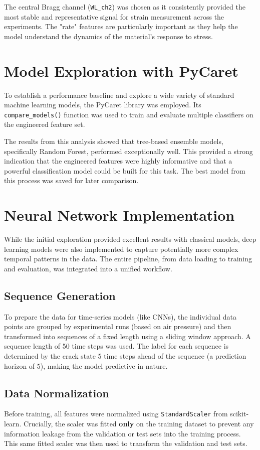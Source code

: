 \documentclass{article}
\begin{document}
The central Bragg channel (\texttt{WL\_ch2}) was chosen as it consistently provided the most stable and representative signal for strain measurement across the experiments. The "rate" features are particularly important as they help the model understand the dynamics of the material's response to stress.

\section{Model Exploration with PyCaret}

To establish a performance baseline and explore a wide variety of standard machine learning models, the PyCaret library was employed. Its \texttt{compare\_models()} function was used to train and evaluate multiple classifiers on the engineered feature set.

The results from this analysis showed that tree-based ensemble models, specifically Random Forest, performed exceptionally well. This provided a strong indication that the engineered features were highly informative and that a powerful classification model could be built for this task. The best model from this process was saved for later comparison.

\section{Neural Network Implementation}
While the initial exploration provided excellent results with classical models, deep learning models were also implemented to capture potentially more complex temporal patterns in the data. The entire pipeline, from data loading to training and evaluation, was integrated into a unified workflow.

\subsection{Sequence Generation}
To prepare the data for time-series models (like CNNs), the individual data points are grouped by experimental runs (based on air pressure) and then transformed into sequences of a fixed length using a sliding window approach. A sequence length of 50 time steps was used. The label for each sequence is determined by the crack state 5 time steps ahead of the sequence (a prediction horizon of 5), making the model predictive in nature.

\subsection{Data Normalization}
Before training, all features were normalized using \texttt{StandardScaler} from scikit-learn. Crucially, the scaler was fitted \textbf{only} on the training dataset to prevent any information leakage from the validation or test sets into the training process. This same fitted scaler was then used to transform the validation and test sets.
\end{document}
